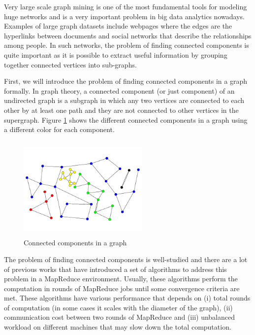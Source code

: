 Very large scale graph mining is one of the most fundamental tools for modeling huge networks and is a very important problem in big data analytics nowadays. Examples of large graph datasets include webpages where the edges are the hyperlinks between documents and social networks that describe the relationships among people. In such networks, the problem of finding connected components is quite important as it is possible to extract useful information by grouping together connected vertices into sub-graphs.

First, we will introduce the problem of finding connected components in a graph formally. In graph theory, a connected component (or just component) of an undirected graph is a subgraph in which any two vertices are connected to each other by at least one path and they are not connected to other vertices in the supergraph. Figure \ref{figure:connected} shows the different connected components in a graph using a different color for each component.

\begin{figure}[hb]
 \centering
    \includegraphics[height=12pc,width=15pc]{figures/connected_components.png}
	\caption{Connected components in a graph}
    \label{figure:connected}
\end{figure}

The problem of finding connected components is well-studied and there are a lot of previous works that have introduced a set of algorithms to address this problem in a MapReduce \cite{mapreduce} environment. Usually, these algorithms perform the computation in rounds of MapReduce jobs until some convergence criteria are met. These algorithms have various performance that depends on (i) total rounds of computation (in some cases it scales with the diameter of the graph), (ii) communication cost between two rounds of MapReduce and (iii) unbalanced workload on different machines that may slow down the total computation.

